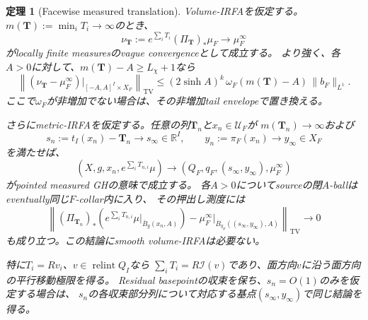 \documentclass[11pt,a4paper]{ltjsarticle}
\newcommand{\RR}{\mathbb R}
\newcommand{\cI}{\mathcal I}
\theoremstyle{plain}
\newtheorem{theorem}{定理}[section]
\theoremstyle{definition}
\theoremstyle{remark}
\begin{document}
\begin{theorem}[Facewise measured translation]
\label{thm:translation}
Volume-IRFAを仮定する。$m(\bm T):=\min_iT_i\to\infty$のとき、
\[
 \nu_{\bm T}:=e^{\sum_iT_i}(\Pi_{\bm T})_*\mu_F
 \longrightarrow\mu_F^\infty
\]
がlocally finite measuresのvague convergenceとして成立する。
より強く、各$A>0$に対して、$m(\bm T)-A\ge L_\chi+1$なら
\begin{equation}
\label{eq:translation-TV-strip}
 \left\|(\nu_{\bm T}-\mu_F^\infty)
       \big|_{[-A,A]^I\times X_F}\right\|_{\mathrm{TV}}
 \le (2\sinh A)^k\,
       \omega_F(m(\bm T)-A)\,\|b_F\|_{L^1}.
\end{equation}
ここで$\omega_F$が非増加でない場合は、その非増加tail envelopeで置き換える。

さらにmetric-IRFAを仮定する。任意の列$\bm T_n$と$x_n\in\mathcal U_F$が
$m(\bm T_n)\to\infty$および
\begin{equation}
\label{eq:translation-offset}
 s_n:=t_I(x_n)-\bm T_n\longrightarrow s_\infty\in\RR^I,
 \qquad y_n:=\pi_F(x_n)\longrightarrow y_\infty\in X_F
\end{equation}
を満たせば、
\begin{equation}
\label{eq:translation-pmGH}
 (X,g,x_n,e^{\sum_iT_{n,i}}\mu)
 \longrightarrow
 (Q_F,q_F,(s_\infty,y_\infty),\mu_F^\infty)
\end{equation}
がpointed measured GHの意味で成立する。
各$A>0$についてsourceの閉$A$-ballはeventually同じ$F$-collar内に入り、
その押出し測度には
\begin{equation}
\label{eq:translation-TV-ball}
 \left\|
 (\Pi_{\bm T_n})_*
 \left(e^{\sum_iT_{n,i}}\mu\big|_{\overline B_g(x_n,A)}\right)
 -\mu_F^\infty\big|_{\overline B_{q_F}((s_\infty,y_\infty),A)}
 \right\|_{\mathrm{TV}}\longrightarrow0
\end{equation}
も成り立つ。この結論にsmooth volume-IRFAは必要ない。

特に$T_i=Rv_i$、$v\in\operatorname{relint}Q_I$なら
$\sum_iT_i=R\cI(v)$であり、面方向$v$に沿う面方向の平行移動極限を得る。
Residual basepointの収束を保ち、$s_n=O(1)$のみを仮定する場合は、
$s_n$の各収束部分列について対応する基点$(s_\infty,y_\infty)$で同じ結論を得る。
\end{theorem}
\end{document}
